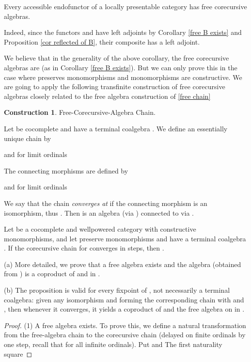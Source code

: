 \documentclass{LMCS}
\theoremstyle{plain}
\theoremstyle{definition}
\newtheorem{construction}[theorem]{Construction}
\numberwithin{equation}{section}
\begin{document}
\begin{defi}
\begin{cor}
Every accessible endofunctor of a locally presentable category has free corecursive algebras.
\end{cor}
Indeed, since the functors  and  have left adjoints by Corollary \ref{free B exists} and Proposition \ref{cor reflected of B}, their composite has a left adjoint.

\begin{rem}
We believe  that in the generality of the above corollary, the free corecursive algebras are  (as in Corollary \ref{free B exists}). But we can only prove this in the case where  preserves monomorphisms and monomorphisms are constructive. We are going to apply the following transfinite construction of free corecursive algebras closely related to the free algebra construction of \ref{free chain}
\end{rem}

\begin{construction}\label{free core.chain}Free-Corecursive-Algebra Chain.

Let  be cocomplete and  have a terminal coalgebra . We define an essentially unique chain  by

and for limit ordinals 

The connecting morphisms  are defined by


and for limit ordinals 

We say that the chain {\it converges at } if the connecting morphism  is an isomorphism, thus . Then  is an algebra (via ) connected to  via .
\end{construction}

\begin{prop}\label{cor chain converges U=T+FY}
Let  be a cocomplete and wellpowered category with constructive mono\-morphisms, and let  preserve monomorphisms and have a terminal coalgebra . If the corecursive chain for  converges in  steps, then .
\end{prop}

\begin{rem}
(a) More detailed, we prove that a free algebra  exists and the algebra  (obtained from ) is a coproduct of  and  in .

(b) The proposition is valid for every fixpoint of , not necessarily a terminal coalgebra: given any isomorphism  and forming the corresponding chain with  and , then  whenever it converges, it yields a coproduct of  and the free algebra on  in .
\end{rem}
\begin{proof}(1) A free algebra  exists. To prove this, we define a natural transformation  from the free-algebra chain to the corecursive chain (delayed on finite ordinals by one step, recall that  for all infinite ordinals). Put 
and 
The first naturality square


\end{proof}
\end{defi}
\end{document}
